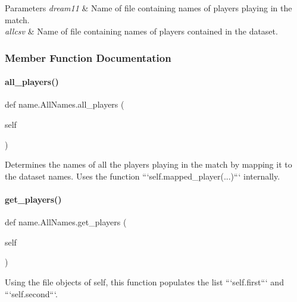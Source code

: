 \begin{DoxyParams}{Parameters}
{\em dream11} & Name of file containing names of players playing in the match. \\
\hline
{\em allcsv} & Name of file containing names of players contained in the dataset. \\
\hline
\end{DoxyParams}


\subsubsection{Member Function Documentation}
\mbox{\label{classname_1_1AllNames_a9de21d794d9868b1d42fb103f6643ba7}} 
\paragraph{\texorpdfstring{all\+\_\+players()}{all\_players()}}
{\footnotesize\ttfamily def name.\+All\+Names.\+all\+\_\+players (\begin{DoxyParamCaption}\item[{}]{self }\end{DoxyParamCaption})}

\begin{DoxyVerb}Determines the names of all the players playing in the match by mapping it to the dataset names. Uses the function ```self.mapped_player(...)``` internally.
\end{DoxyVerb}
 \mbox{\label{classname_1_1AllNames_a766b1d340e8df73fa313e7ceec65c150}} 
\paragraph{\texorpdfstring{get\+\_\+players()}{get\_players()}}
{\footnotesize\ttfamily def name.\+All\+Names.\+get\+\_\+players (\begin{DoxyParamCaption}\item[{}]{self }\end{DoxyParamCaption})}

\begin{DoxyVerb}Using the file objects of self, this function populates the list ```self.first``` and ```self.second```.
\end{DoxyVerb}
 \mbox{\label{classname_1_1AllNames_a9cd51d0c9394ed62cfc62c688dc5434f}} 
